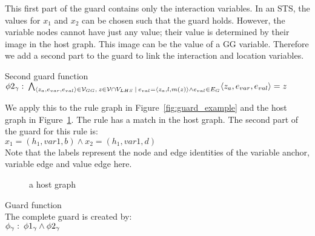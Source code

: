 This first part of the guard contains only the interaction variables. In an STS, the values for $x_1$ and $x_2$ can be chosen such that the guard holds. However, the variable nodes cannot have just any value; their value is determined by their image in the host graph. This image can be the value of a GG variable. Therefore we add a second part to the guard to link the interaction and location variables.
\vspace{10px}\begin{definition} Second guard function
\vspace{2px} \\
$\phi 2_{\gamma}:\: \bigwedge_{\langle z_a, e_{var}, e_{val}\rangle \in \mathcal{V}_{GG},\: z \in \mathcal{V} \cap V_{LHS}\: |\: e_{val} = \langle z_a, l, m(z)\rangle \land e_{val} \in E_{G}} \langle z_a, e_{var}, e_{val}\rangle = z$
\end{definition}
\vspace{10px}
We apply this to the rule graph in Figure~\ref{fig:guard_example} and the host graph in Figure~\ref{fig:guard_example_host}. The rule has a match in the host graph. The second part of the guard for this rule is:
\vspace{5px} \\
$x_1 = (h_1,var1,b) \land x_2 = (h_1,var1,d)$
\vspace{5px} \\
Note that the labels represent the node and edge identities of the variable anchor, variable edge and value edge here.

\begin{figure}[h]
  \begin{center}
    
  \end{center}
  \caption{a host graph}
  \label{fig:guard_example_host}
\end{figure}

\vspace{10px}\begin{definition} Guard function \\
The complete guard is created by:
\vspace{5px} \\
$\phi_{\gamma}:\:\phi 1_{\gamma} \land \phi 2_{\gamma}$
\end{definition}

